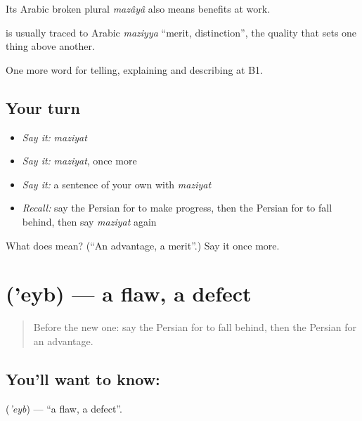 Its Arabic broken plural \emph{mazâyâ} also means benefits at work.

\begin{cousinweb}
\textbf{} is usually traced to Arabic \emph{maziyya} \textquotedblleft{}merit, distinction\textquotedblright{}, the quality that sets one thing above another.
\end{cousinweb}

\begin{grammarlens}[title={What you've built}]
One more word for telling, explaining and describing at B1.
\end{grammarlens}

\subsection*{Your turn}
\begin{itemize}
\raggedright
  \item \emph{Say it:} \emph{maziyat}
  \item \emph{Say it:} \emph{maziyat}, once more
  \item \emph{Say it:} a sentence of your own with \emph{maziyat}
  \item \emph{Recall:} say the Persian for to make progress, then the Persian for to fall behind, then say \emph{maziyat} again
\end{itemize}

\begin{tcolorbox}[breakable,colback=teal!4,colframe=teal!35!black,title={Before you move on}]
What does  mean? (\textquotedblleft{}An advantage, a merit\textquotedblright{}.) Say it once more.
\end{tcolorbox}
\section[\texorpdfstring{\fa{عیب} ('eyb)}{عیب ('eyb)}]{ ('eyb) — a flaw, a defect}

\label{lesson:FA-C375-eyb}



\begin{quote}
Before the new one: say the Persian for to fall behind, then the Persian for an advantage.
\end{quote}

\subsection*{You'll want to know: }
\textbf{} (\emph{'eyb}) — \textquotedblleft{}a flaw, a defect\textquotedblright{}.

